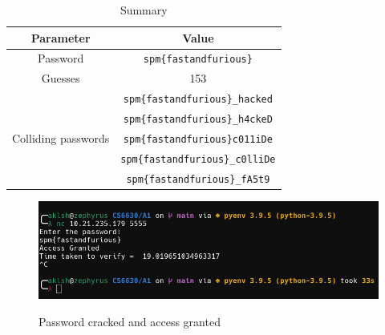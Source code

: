 \documentclass[12pt,a4paper,english]{paper}
\begin{document}
\begin{table}[H]
\centering
\begin{tabular}{@{}cc@{}}
\toprule
\textbf{Parameter}           & \textbf{Value}                 \\ \midrule
\multicolumn{1}{c}{Password} & \texttt{spm\{fastandfurious\}}  \\ \midrule
\multicolumn{1}{c}{Guesses}  & 153                             \\ \midrule
\multicolumn{1}{c}{\multirow{6}{*}{Colliding passwords}} & \texttt{spm\{fastandfurious\}\_hacked}              \\ \cmidrule(l){2-2}
\multicolumn{1}{c}{}                                     & \texttt{spm\{fastandfurious\}\_h4ckeD}  \\ \cmidrule(l){2-2}
\multicolumn{1}{c}{}                                     & \texttt{spm\{fastandfurious\}c011iDe}   \\ \cmidrule(l){2-2}
\multicolumn{1}{c}{}                                     & \texttt{spm\{fastandfurious\}\_c0lliDe} \\ \cmidrule(l){2-2}
\multicolumn{1}{c}{}                                     & \texttt{spm\{fastandfurious\}\_fA5t9} \\ \bottomrule
\end{tabular}
\caption{Summary}
\label{tab:summary}
\end{table}

\begin{figure}[H]
    \centering
    \includegraphics[scale=0.4]{Q2_output.png}
    \label{fig:output_password}
    \caption{Password cracked and access granted}
\end{figure}







\end{document}
